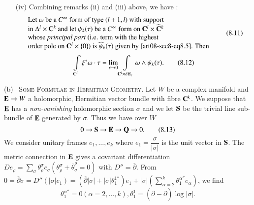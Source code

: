 \begin{remarks*}
\begin{itemize}
Note that $\xi^{*}\omega=\left[\begin{smallmatrix} \gamma_{1}\\ \vdots\\ \gamma_{k}\end{smallmatrix}\right]$ is here the {\em Poincar\'e residue} of $\omega$ on $\bfC^{l}\times \{0\}\subset \bfC^{l}\times \bfC^{k}$.

\item[(iv)] Combining remarks (ii) and (iii) above, we have :
\begin{equation*}
\begin{array}{l}
\text{Let $\omega$ be a $C^{\infty}$ form of type $(l+1,l)$ with support}\\
\text{in $\Delta^{l}\times \mathbf{C}^{k}$ and let $\psi_{k}(\tau)$ be a $C^{\infty}$ form on $\mathbf{C}^{l}\times \widehat{\mathbf{C}}^{k}$}\\
\text{whose {\em principal part} (i.e. term with the highest}\\
\text{order pole on $\mathbf{C}^{l}\times \{0\}$) is $\widehat{\psi}_{k}(\tau)$ given by \eqref{art08-sec8-eq8.5}. Then}
\end{array}\tag{8.11}\label{art08-sec8-eq8.11}
\end{equation*}
\begin{equation*}
\int\limits_{\mathbf{C}^{l}}\xi^{*}\omega\cdot \tau=\lim\limits_{\epsilon\to 0}\int\limits_{\mathbf{C}^{l}\times \delta B_{\epsilon}}\omega\wedge \psi_{k}(\tau).\tag{8.12}\label{art08-sec8-eq8.12}
\end{equation*}
\end{itemize}
\end{remarks*}

(b)~ \textsc{Some Formulae in Hermitian Geometry.} Let $W$ be a complex manifold and $\mathbf{E}\to W$ a holomorphic, Hermitian vector bundle with fibre $\mathbf{C}^{k}$. We suppose that $\mathbf{E}$ has a {\em non-vanishing} holomorphic section $\sigma$ and we let $\mathbf{S}$ be the trivial line sub-bundle of $\mathbf{E}$ generated by $\sigma$. Thus we have over $W$
\begin{equation*}
0\to \mathbf{S}\to \mathbf{E}\to \mathbf{Q}\to 0.\tag{8.13}\label{art08-sec8-eq8.13}
\end{equation*}
We consider unitary frames $e_{1},\ldots,e_{k}$ where $e_{1}=\dfrac{\sigma}{|\sigma|}$ is the unit vector in $\mathbf{S}$. The metric connection in $\mathbf{E}$ gives a covariant differentiation $De_{\rho}=\sum\limits_{\sigma}\theta^{\sigma}_{\rho}e_{\sigma}(\theta^{\sigma}_{\rho}+\overline{\theta}^{\rho}_{\sigma}=0)$ with $D''=\overline{\partial}$. From $0=\overline{\partial}\sigma=D''(|\sigma|e_{1})=(\overline{\partial}|\sigma|+|\sigma|\theta^{1''}_{1})e_{1}+|\sigma|\left(\sum\limits_{\alpha=2}^{k}\theta^{\alpha''}_{1}e_{\alpha}\right)$, we find
\begin{equation*}
\theta^{\alpha''}_{1}=0(\alpha=2,\ldots,k),\theta^{1}_{1}=(\partial-\overline{\partial})\log |\sigma|.\tag{8.14}\label{art08-sec8-eq8.14}
\end{equation*}

